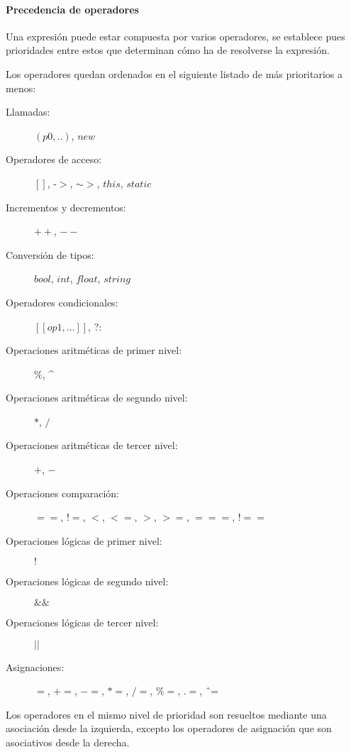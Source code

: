 
\paragraph{Precedencia de operadores} \label{sec:op_pre}

Una expresión puede estar compuesta por varios operadores, se establece pues prioridades entre estos que determinan 
cómo ha de resolverse la expresión. 

Los operadores quedan ordenados en el siguiente listado de más prioritarios a menos:

\begin{description}
\item [Llamadas:] $(p0,..)$, $new$
\item [Operadores de acceso:] $[]$, -$>$, $\sim>$, $this$, $static$
\item [Incrementos y decrementos:] $++$, $--$
\item [Conversión de tipos:] $bool$, $int$, $float$, $string$
\item [Operadores condicionales:] $[[op1,...]]$, $?:$
\item [Operaciones aritméticas de primer nivel:] $\%$, \^ \hfill  
\item [Operaciones aritméticas de segundo nivel:] $*$, $/$
\item [Operaciones aritméticas de tercer nivel:] $+$, $-$
\item [Operaciones comparación:] $==$, $!=$, $<$, $<=$, $>$, $>=$, $===$, $!==$
\item [Operaciones lógicas de primer nivel:] $!$
\item [Operaciones lógicas de segundo nivel:] $\&\&$
\item [Operaciones lógicas de tercer nivel:] $||$
\item [Asignaciones:] $=$, $+=$, $-=$, $*=$, $/=$, $\%=$, $.=$, \^ \ =\hfill 
\end{description} 

Los operadores en el mismo nivel de prioridad son resueltos mediante una asociación desde la izquierda, excepto los operadores de asignación que son asociativos desde la derecha.

